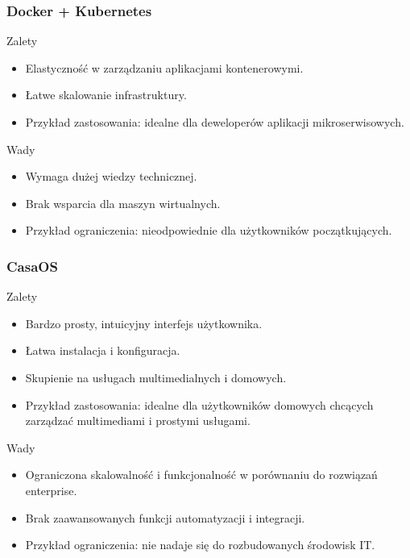 \subsubsection{Docker \cite{Docker} + Kubernetes \cite{Kubernetes}}
\begin{minipage}{0.45\textwidth}
    Zalety
    \begin{itemize}
        \item Elastyczność w zarządzaniu aplikacjami kontenerowymi.
        \item Łatwe skalowanie infrastruktury.
        \item Przykład zastosowania: idealne dla deweloperów aplikacji mikroserwisowych.
    \end{itemize}
\end{minipage}\hfil
\begin{minipage}{0.45\textwidth}
    Wady
    \begin{itemize}
        \item Wymaga dużej wiedzy technicznej.
        \item Brak wsparcia dla maszyn wirtualnych.
        \item Przykład ograniczenia: nieodpowiednie dla użytkowników początkujących.
    \end{itemize}
\end{minipage}

\subsubsection{CasaOS \cite{CasaOS}}
\begin{minipage}{0.45\textwidth}
    Zalety
    \begin{itemize}
        \item Bardzo prosty, intuicyjny interfejs użytkownika.
        \item Łatwa instalacja i konfiguracja.
        \item Skupienie na usługach multimedialnych i domowych.
        \item Przykład zastosowania: idealne dla użytkowników domowych chcących zarządzać multimediami i prostymi usługami.
    \end{itemize}
\end{minipage}\hfil
\begin{minipage}{0.45\textwidth}
    Wady
    \begin{itemize}
        \item Ograniczona skalowalność i funkcjonalność w porównaniu do rozwiązań enterprise.
        \item Brak zaawansowanych funkcji automatyzacji i integracji.
        \item Przykład ograniczenia: nie nadaje się do rozbudowanych środowisk IT.
    \end{itemize}
\end{minipage}

